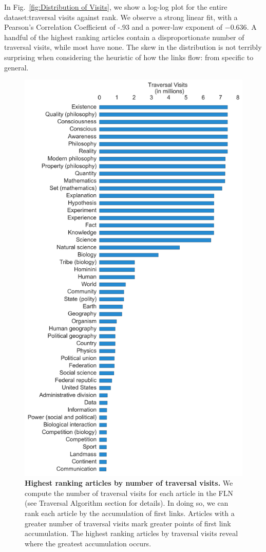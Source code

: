 \documentclass[pre,twocolumn,twoside,superscriptaddress,floatfix, aps, 10pt]{revtex4-1}
\begin{document}
In Fig.~\ref{fig:Distribution of Visits}, we show a log-log plot for the entire dataset:traversal visits against rank. 
We observe a strong linear fit, with a Pearson's Correlation Coefficient of -.93 and 
a power-law exponent of $-0.636$. A handful of the highest ranking articles contain a disproportionate number of traversal visits, while most have none. The skew in the distribution is not terribly surprising when considering the heuristic of how the links flow: from specific to general. 


\begin{figure}[tp!]
  \includegraphics[width=\columnwidth]{graphics/articles_ranked.png}
  \caption{
    \textbf{Highest ranking articles by number of traversal visits.}
We compute the number of traversal visits for each article in the FLN (see 
Traversal Algorithm section for details). In doing so, we can rank each article
by the accumulation of first links. Articles with a greater number of traversal visits
mark greater points of first link accumulation. The highest ranking articles by traversal visits reveal where the greatest accumulation occurs.}
  \label{fig:highest visits}
\end{figure}
\end{document}

